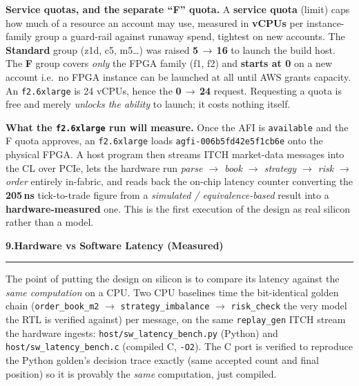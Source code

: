 \documentclass[10pt,a4paper]{article}
\newcommand{\sectionrule}{\par\nobreak\vspace{1pt}\textcolor{rulegray}{\rule{\linewidth}{0.8pt}}\par\vspace{1pt}}
\newcommand{\fpath}[1]{\texttt{\textcolor{hdrblue}{#1}}}
\newcommand{\cmd}[1]{\texttt{\textcolor{accentteal}{#1}}}
\newcommand{\sechead}[2]{{\large\bfseries\color{hdrblue} #1\quad #2}\sectionrule}
\begin{document}
\smallskip
{\bfseries\color{accentteal} Service quotas, and the separate ``F'' quota.}
A \textbf{service quota} (limit) caps how much of a resource an account may use,
measured in \textbf{vCPUs} per instance-family group \textendash{} a guard-rail
against runaway spend, tightest on new accounts. The \textbf{Standard} group
(z1d, c5, m5\ldots) was raised \textbf{5}\,$\rightarrow$\,\textbf{16} to launch
the build host. The \textbf{F} group covers \emph{only} the FPGA family (f1, f2)
and \textbf{starts at 0} on a new account \textendash{} i.e.\ no FPGA instance can
be launched at all until AWS grants capacity. An \fpath{f2.6xlarge} is 24 vCPUs,
hence the \textbf{0}\,$\rightarrow$\,\textbf{24} request. Requesting a quota is
free and merely \emph{unlocks the ability} to launch; it costs nothing itself.

\smallskip
{\bfseries\color{accentteal} What the \fpath{f2.6xlarge} run will measure.}
Once the AFI is \fpath{available} and the F quota approves, an \fpath{f2.6xlarge}
loads \fpath{agfi-006b5fd42e5f1cb6e} onto the physical FPGA. A host program then
streams ITCH market-data messages into the CL over PCIe, lets the hardware run
\emph{parse $\rightarrow$ book $\rightarrow$ strategy $\rightarrow$ risk
$\rightarrow$ order} entirely in-fabric, and reads back the on-chip latency
counter \textendash{} converting the \textbf{205\,ns} tick-to-trade figure from a
\emph{simulated / equivalence-based} result into a \textbf{hardware-measured} one.
This is the first execution of the design as real silicon rather than a model.

\sechead{9.}{Hardware vs Software Latency (Measured)}

The point of putting the design on silicon is to compare its latency against the
\emph{same computation} on a CPU. Two CPU baselines time the bit-identical golden
chain (\fpath{order\_book\_m2} $\rightarrow$ \fpath{strategy\_imbalance}
$\rightarrow$ \fpath{risk\_check} \textendash{} the very model the RTL is verified
against) per message, on the same \fpath{replay\_gen} ITCH stream the hardware
ingests: \fpath{host/sw\_latency\_bench.py} (Python) and
\fpath{host/sw\_latency\_bench.c} (compiled C, \cmd{-O2}). The C port is verified
to reproduce the Python golden's decision trace exactly (same accepted count and
final position) \textendash{} so it is provably the \emph{same} computation,
just compiled.
\end{document}
